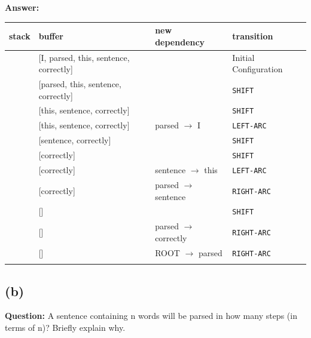 \documentclass[11pt]{article}
\begin{document}
\textbf{Answer:}
\begin{table}[H]
  \centering
  \begin{tabular}{p{}|p{}|p{}|p{}}
    stack  & buffer & new dependency & transition\\
    \hline
    [ROOT]                         & [I, parsed, this, sentence, correctly] &                         & Initial Configuration \\\relax
    [ROOT, I]                      & [parsed, this, sentence, correctly]    &                         & \verb|SHIFT| \\              & [this, sentence, correctly]            &                         & \verb|SHIFT| \\                 & [this, sentence, correctly]            & parsed $\to$ I          & \verb|LEFT-ARC| \\           & [sentence, correctly]                  &                         & \verb|SHIFT| \\ & [correctly]                            &                         & \verb|SHIFT| \\       & [correctly]                            & sentence $\to$ this     & \verb|LEFT-ARC| \\                 & [correctly]                            & parsed $\to$ sentence   & \verb|RIGHT-ARC| \\      & []                                     &                         & \verb|SHIFT| \\                 & []                                     & parsed $\to$ correctly  & \verb|RIGHT-ARC| \\\relax
    [ROOT]                         & []                                     & ROOT $\to$ parsed       & \verb|RIGHT-ARC| \\\relax
  \end{tabular}
\end{table}

\subsection*{(b)}

\textbf{Question:} A sentence containing n words will be parsed in how many steps (in terms of n)? Briefly explain why.
\end{document}
